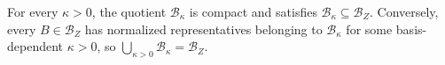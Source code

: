 For every \(\kappa>0\), the quotient \(\mathcal B_\kappa\) is compact and satisfies \(\mathcal B_\kappa\subseteq\mathcal B_Z\). Conversely, every \(B\in\mathcal B_Z\) has normalized representatives belonging to \(\mathcal B_\kappa\) for some basis-dependent \(\kappa>0\), so \(\bigcup_{\kappa>0}\mathcal B_\kappa=\mathcal B_Z\).